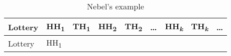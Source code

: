 \documentclass[
  11pt,
  letterpaper,
  DIV=11,
  numbers=noendperiod,
  twoside]{scrartcl}
\begin{document}
\begin{longtable}[]{@{}
  >{\raggedleft\arraybackslash}p{}
  >{\centering\arraybackslash}p{}
  >{\centering\arraybackslash}p{}
  >{\centering\arraybackslash}p{}
  >{\centering\arraybackslash}p{}
  >{\centering\arraybackslash}p{}
  >{\centering\arraybackslash}p{}
  >{\centering\arraybackslash}p{}
  >{\centering\arraybackslash}p{}@{}}
\caption{Nebel's example}\label{tbl-nebel}\tabularnewline
\toprule\noalign{}
\begin{minipage}[b]{\linewidth}\raggedleft
Lottery
\end{minipage} & \begin{minipage}[b]{\linewidth}\centering
{H}H\textsubscript{1}
\end{minipage} & \begin{minipage}[b]{\linewidth}\centering
{T}H\textsubscript{1}
\end{minipage} & \begin{minipage}[b]{\linewidth}\centering
{H}H\textsubscript{2}
\end{minipage} & \begin{minipage}[b]{\linewidth}\centering
{T}H\textsubscript{2}
\end{minipage} & \begin{minipage}[b]{\linewidth}\centering
\ldots{}
\end{minipage} & \begin{minipage}[b]{\linewidth}\centering
{H}H\textsubscript{\emph{k}}
\end{minipage} & \begin{minipage}[b]{\linewidth}\centering
{T}H\textsubscript{\emph{k}}
\end{minipage} & \begin{minipage}[b]{\linewidth}\centering
\ldots{}
\end{minipage} \\
\midrule\noalign{}
\endfirsthead
\toprule\noalign{}
\begin{minipage}[b]{\linewidth}\raggedleft
Lottery
\end{minipage} & \begin{minipage}[b]{\linewidth}\centering
{H}H\textsubscript{1}

\end{minipage}
\end{longtable}
\end{document}
